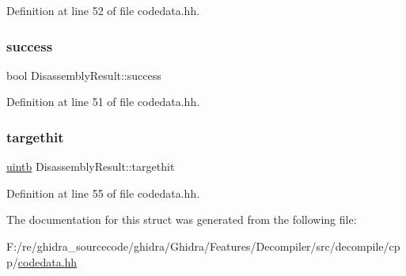 Definition at line 52 of file codedata.\+hh.

\mbox{\label{struct_disassembly_result_a461520ce7ea2e8db1e2eeaba39f6a104}} 
\subsubsection{\texorpdfstring{success}{success}}
{\footnotesize\ttfamily bool Disassembly\+Result\+::success}



Definition at line 51 of file codedata.\+hh.

\mbox{\label{struct_disassembly_result_ad38937f35c1f1a11450f6e7d36c69851}} 
\subsubsection{\texorpdfstring{targethit}{targethit}}
{\footnotesize\ttfamily \mbox{\hyperlink{types_8h_a2db313c5d32a12b01d26ac9b3bca178f}{uintb}} Disassembly\+Result\+::targethit}



Definition at line 55 of file codedata.\+hh.



The documentation for this struct was generated from the following file\+:\begin{DoxyCompactItemize}
\item 
F\+:/re/ghidra\+\_\+sourcecode/ghidra/\+Ghidra/\+Features/\+Decompiler/src/decompile/cpp/\mbox{\hyperlink{codedata_8hh}{codedata.\+hh}}\end{DoxyCompactItemize}
